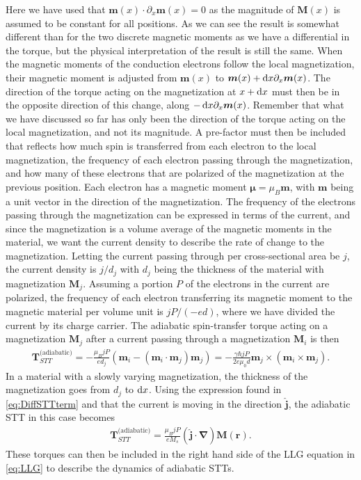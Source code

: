 Here we have used that $\mathbold{m}(x)\cdot\partial_x \mathbold{m}(x) = 0$ as the magnitude of $\mathbold{M}(x)$ is assumed to be constant for all positions. As we can see the result is somewhat different than for the two discrete magnetic moments as we have a differential in the torque, but the physical interpretation of the result is still the same. When the magnetic moments of the conduction electrons follow the local magnetization, their magnetic moment is adjusted from $\mathbold{m}(x)$ to $\mathbold{m}(x) + \d x \partial_x \mathbold{m}(x)$. The direction of the torque acting on the magnetization at $x +\operatorname{d}\!{x}$ must then be in the opposite direction of this change, along $-\d x \partial_x \mathbold{m}(x)$. Remember that what we have discussed so far has only been the direction of the torque acting on the local magnetization, and not its magnitude. A pre-factor must then be included that reflects how much spin is transferred from each electron to the local magnetization, the frequency of each electron passing through the magnetization, and how many of these electrons that are polarized of the magnetization at the previous position. Each electron has a magnetic moment $\mathbold{\mu} = \mu_B \mathbold{m}$, with $\mathbold{m}$ being a unit vector in the direction of the magnetization. The frequency of the electrons passing through the magnetization can be expressed in terms of the current, and since the magnetization is a volume average of the magnetic moments in the material, we want the current density to describe the rate of change to the magnetization. Letting the current passing through per cross-sectional area be $j$, the current density is $j/d_j$ with $d_j$ being the thickness of the material with magnetization $\mathbold{M}_j$. Assuming a portion $P$ of the electrons in the current are polarized, the frequency of each electron transferring its magnetic moment to the magnetic material per volume unit is $jP/(-ed)$, where we have divided the current by its charge carrier. The adiabatic spin-transfer torque acting on a magnetization $\mathbold{M}_j$ after a current passing through a magnetization $\mathbold{M}_i$ is then
\begin{align}
    \mathbold{T}_{STT}^{\textrm{(adiabatic)}} = -\frac{\mu_B j P}{e d_j} (\mathbold{m}_i-(\mathbold{m}_i\cdot\mathbold{m}_j)\mathbold{m}_j)
    = -\frac{\gamma \hbar jP}{2 e \mu_0 d}\mathbold{m}_j\times\left(\mathbold{m}_i\times\mathbold{m}_j\right).
    \label{eq:STT_Adiabatic_Macro}
\end{align}
In a material with a slowly varying magnetization, the thickness of the magnetization goes from $d_j$ to $\operatorname{d}\!{x}$. Using the expression found in \eqref{eq:DiffSTTterm} and that the current is moving in the direction $\mathbold{\hat{j}}$, the adiabatic STT in this case becomes
\begin{align}
 \mathbold{T}_{STT}^{\textrm{(adiabatic)}} = \frac{\mu_B j P}{e M_s} (\mathbold{\hat{j}}\cdot\mathbold{\nabla})\mathbold{M}(\mathbold{r}). \label{eq:AdSTTnonuniform}
\end{align}
These torques can then be included in the right hand side of the LLG equation in \eqref{eq:LLG} to describe the dynamics of adiabatic STTs.

